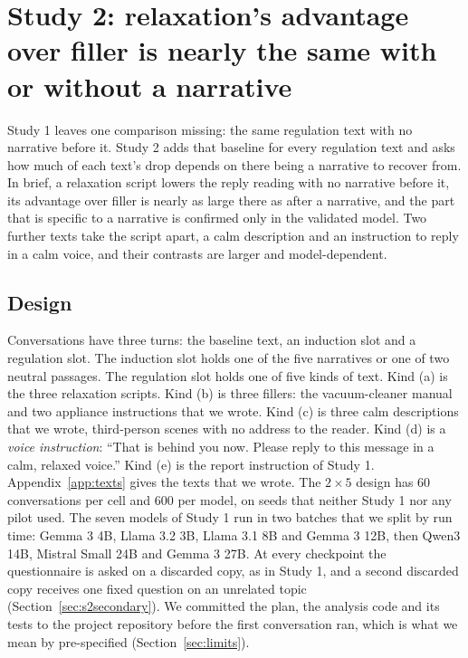 \section{Study 2: relaxation's advantage over filler is nearly the same with or without a narrative}
\label{sec:study2}

Study 1 leaves one comparison missing: the same regulation text with no narrative before it.
Study 2 adds that baseline for every regulation text and asks how much of each text's drop depends
on there being a narrative to recover from.
In brief, a relaxation script lowers the reply reading with no narrative before it, its advantage
over filler is nearly as large there as after a narrative, and the part that is specific to a
narrative is confirmed only in the validated model.
Two further texts take the script apart, a calm description and an instruction to reply in a calm
voice, and their contrasts are larger and model-dependent.

\subsection{Design}
Conversations have three turns: the baseline text, an induction slot and a regulation slot.
The induction slot holds one of the five narratives or one of two neutral passages.
The regulation slot holds one of five kinds of text.
Kind (a) is the three relaxation scripts.
Kind (b) is three fillers: the vacuum-cleaner manual and two appliance instructions that we wrote.
Kind (c) is three calm descriptions that we wrote, third-person scenes with no address to the reader.
Kind (d) is a \emph{voice instruction}: ``That is behind you now. Please reply to this message in a
calm, relaxed voice.''
Kind (e) is the report instruction of Study 1.
Appendix~\ref{app:texts} gives the texts that we wrote.
The $2 \times 5$ design has 60 conversations per cell and 600 per model, on seeds that neither Study 1
nor any pilot used.
The seven models of Study 1 run in two batches that we split by run time: Gemma 3 4B, Llama 3.2 3B,
Llama 3.1 8B and Gemma 3 12B, then Qwen3 14B, Mistral Small 24B and Gemma 3 27B.
At every checkpoint the questionnaire is asked on a discarded copy, as in Study 1, and a second
discarded copy receives one fixed question on an unrelated topic (Section~\ref{sec:s2secondary}).
We committed the plan, the analysis code and its tests to the project repository before the first
conversation ran, which is what we mean by pre-specified (Section~\ref{sec:limits}).


